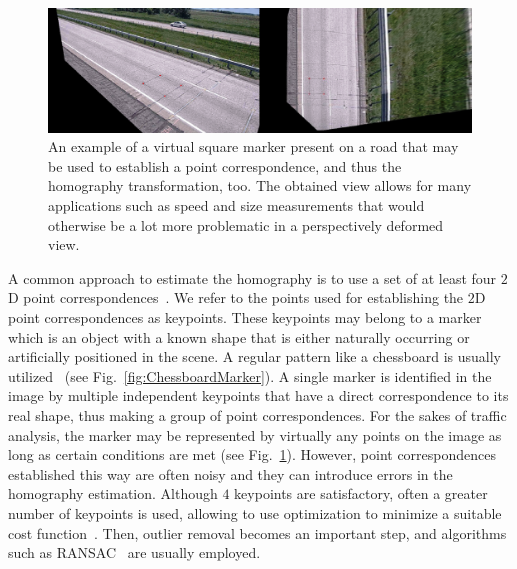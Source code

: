 \begin{figure}[t]
    \centerline{\includegraphics[width=\linewidth]{figures/methodology/homography_road.png}}
    \caption[Square marker on a road]{An example of a virtual square marker present on a road that may be used to establish a point correspondence, and thus the homography transformation, too. The obtained view allows for many applications such as speed and size measurements that would otherwise be a lot more problematic in a perspectively deformed view. }
    \label{fig:RoadMarker}
\end{figure}

A common approach to estimate the homography is to use a set of at least four $2$D point correspondences~\cite{hartley1997defense}. We refer to the points used for establishing the $2$D point correspondences as keypoints. These keypoints may belong to a marker which is an object with a known shape that is either naturally occurring or artificially positioned in the scene. A regular pattern like a chessboard is usually utilized~\cite{zhang2016flexible} (see Fig.~\ref{fig:ChessboardMarker}). A single marker is identified in the image by multiple independent keypoints that have a direct correspondence to its real shape, thus making a group of point correspondences. For the sakes of traffic analysis, the marker may be represented by virtually any points on the image as long as certain conditions are met (see Fig.~\ref{fig:RoadMarker}). However, point correspondences established this way are often noisy and they can introduce errors in the homography estimation. Although $4$ keypoints are satisfactory, often a greater number of keypoints is used, allowing to use optimization to minimize a suitable cost function~\cite{osuna2016multiobjective, mou2013robust}. Then, outlier removal becomes an important step, and algorithms such as RANSAC~\cite{fischler1981random} are usually employed.

